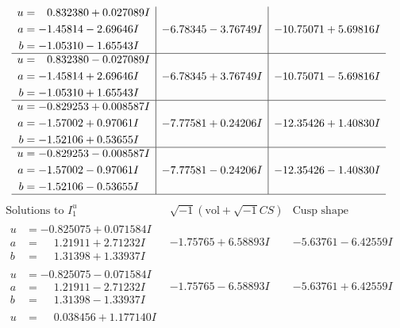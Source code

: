 \documentclass[1p]{elsarticle_modified}
\theoremstyle{definition}
\newcommand{\I}{\sqrt{-1}}
\begin{document}
$$\begin{array}{c|c|c}
\begin{aligned}
u &= \phantom{-}0.832380 + 0.027089 I \\
a &= -1.45814 - 2.69646 I \\
b &= -1.05310 - 1.65543 I\end{aligned}
 & -6.78345 - 3.76749 I & -10.75071 + 5.69816 I \\ \hline\begin{aligned}
u &= \phantom{-}0.832380 - 0.027089 I \\
a &= -1.45814 + 2.69646 I \\
b &= -1.05310 + 1.65543 I\end{aligned}
 & -6.78345 + 3.76749 I & -10.75071 - 5.69816 I \\ \hline\begin{aligned}
u &= -0.829253 + 0.008587 I \\
a &= -1.57002 + 0.97061 I \\
b &= -1.52106 + 0.53655 I\end{aligned}
 & -7.77581 + 0.24206 I & -12.35426 + 1.40830 I \\ \hline\begin{aligned}
u &= -0.829253 - 0.008587 I \\
a &= -1.57002 - 0.97061 I \\
b &= -1.52106 - 0.53655 I\end{aligned}
 & -7.77581 - 0.24206 I & -12.35426 - 1.40830 I\\
 \hline 
 \end{array}$$\newpage$$\begin{array}{c|c|c}  
\text{Solutions to }I^u_{1}& \I (\text{vol} + \sqrt{-1}CS) & \text{Cusp shape}\\
 \hline 
\begin{aligned}
u &= -0.825075 + 0.071584 I \\
a &= \phantom{-}1.21911 + 2.71232 I \\
b &= \phantom{-}1.31398 + 1.33937 I\end{aligned}
 & -1.75765 + 6.58893 I & -5.63761 - 6.42559 I \\ \hline\begin{aligned}
u &= -0.825075 - 0.071584 I \\
a &= \phantom{-}1.21911 - 2.71232 I \\
b &= \phantom{-}1.31398 - 1.33937 I\end{aligned}
 & -1.75765 - 6.58893 I & -5.63761 + 6.42559 I \\ \hline\begin{aligned}
u &= \phantom{-}0.038456 + 1.177140 I \\

\end{aligned}
\end{array}$$
\end{document}
